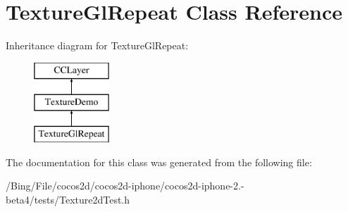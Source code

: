 \hypertarget{interface_texture_gl_repeat}{\section{Texture\-Gl\-Repeat Class Reference}
\label{interface_texture_gl_repeat}
}
Inheritance diagram for Texture\-Gl\-Repeat\-:\begin{figure}[H]
\begin{center}
\leavevmode
\includegraphics[height=3.000000cm]{interface_texture_gl_repeat}
\end{center}
\end{figure}


The documentation for this class was generated from the following file\-:\begin{DoxyCompactItemize}
\item 
/\-Bing/\-File/cocos2d/cocos2d-\/iphone/cocos2d-\/iphone-\/2.-\/beta4/tests/Texture2d\-Test.\-h\end{DoxyCompactItemize}
